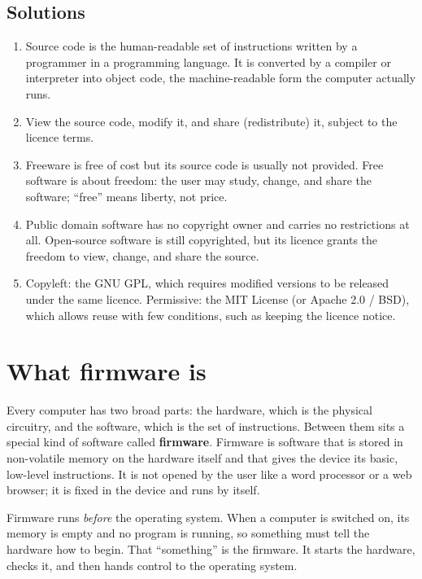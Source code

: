 \subsection*{Solutions}
\begingroup\small
\begin{enumerate}[label=\arabic*.]
  \item Source code is the human-readable set of instructions written by a
    programmer in a programming language. It is converted by a compiler or
    interpreter into object code, the machine-readable form the computer
    actually runs.
  \item View the source code, modify it, and share (redistribute) it, subject
    to the licence terms.
  \item Freeware is free of cost but its source code is usually not provided.
    Free software is about freedom: the user may study, change, and share the
    software; ``free'' means liberty, not price.
  \item Public domain software has no copyright owner and carries no
    restrictions at all. Open-source software is still copyrighted, but its
    licence grants the freedom to view, change, and share the source.
  \item Copyleft: the GNU GPL, which requires modified versions to be released
    under the same licence. Permissive: the MIT License (or Apache 2.0 / BSD),
    which allows reuse with few conditions, such as keeping the licence
    notice.
\end{enumerate}
\endgroup

\section{What firmware is}
Every computer has two broad parts: the hardware, which is the physical
circuitry, and the software, which is the set of instructions. Between them
sits a special kind of software called \textbf{firmware}. Firmware is
software that is stored in non-volatile memory on the hardware itself and
that gives the device its basic, low-level instructions. It is not opened by
the user like a word processor or a web browser; it is fixed in the device
and runs by itself.

Firmware runs \emph{before} the operating system. When a computer is switched
on, its memory is empty and no program is running, so something must tell the
hardware how to begin. That ``something'' is the firmware. It starts the
hardware, checks it, and then hands control to the operating system.

